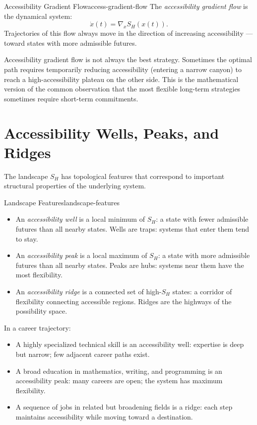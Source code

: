 \begin{definition}{Accessibility Gradient Flow}{access-gradient-flow}
  The \emph{accessibility gradient flow} is the dynamical system:
  \[
    \dot{x}(t) = \nabla_x S_H(x(t)).
  \]
  Trajectories of this flow always move in the direction of increasing
  accessibility — toward states with more admissible futures.
\end{definition}

\begin{remark}
  Accessibility gradient flow is not always the best strategy. Sometimes
  the optimal path requires temporarily reducing accessibility (entering
  a narrow canyon) to reach a high-accessibility plateau on the other side.
  This is the mathematical version of the common observation that the
  most flexible long-term strategies sometimes require short-term commitments.
\end{remark}

\section{Accessibility Wells, Peaks, and Ridges}

The landscape $S_H$ has topological features that correspond to important
structural properties of the underlying system.

\begin{definition}{Landscape Features}{landscape-features}
  \begin{itemize}
    \item An \emph{accessibility well} is a local minimum of $S_H$:
          a state with fewer admissible futures than all nearby states.
          Wells are traps: systems that enter them tend to stay.
    \item An \emph{accessibility peak} is a local maximum of $S_H$:
          a state with more admissible futures than all nearby states.
          Peaks are hubs: systems near them have the most flexibility.
    \item An \emph{accessibility ridge} is a connected set of high-$S_H$
          states: a corridor of flexibility connecting accessible regions.
          Ridges are the highways of the possibility space.
  \end{itemize}
\end{definition}

\begin{example}
  In a career trajectory:
  \begin{itemize}
    \item A highly specialized technical skill is an accessibility well:
          expertise is deep but narrow; few adjacent career paths exist.
    \item A broad education in mathematics, writing, and programming is
          an accessibility peak: many careers are open; the system
          has maximum flexibility.
    \item A sequence of jobs in related but broadening fields is a ridge:
          each step maintains accessibility while moving toward
          a destination.
  \end{itemize}
\end{example}

